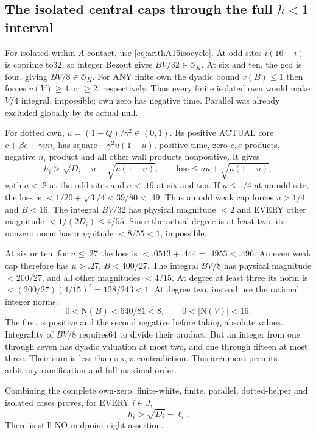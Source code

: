 \subsection{The isolated central caps through the full \(h<1\) interval}
\label{app:arithA15centralisolated}

For isolated-within-\(A\) contact, use
\eqref{eq:arithA15isocycle}.
At odd sites \(i(16-i)\) is coprime to32, so integer Bezout
gives \(BV/32\in\mathcal O_K\).
At six and ten, the gcd is four, giving \(BV/8\in\mathcal O_K\).
For ANY finite own the dyadic bound \(v(B)\le1\) then forces
\(v(V)\ge4\) or \(\ge2\), respectively.
Thus every finite isolated own would make \(V/4\) integral,
impossible; own zero has negative time.
Parallel was already excluded globally by its actual null.

For dotted own, \(u=(1-Q)/\gamma^2\in(0,1)\).
Its positive ACTUAL core
\(c+\beta e+\gamma u n_i\)
has square \(-\gamma^2u(1-u)\), positive time, zero \(c,e\)
products, negative \(n_i\) product and all other wall products
nonpositive.
It gives
\[
 h_i>\sqrt{D_i-u}-\sqrt{u(1-u)},\qquad
 \text{loss}\le au+\sqrt{u(1-u)} ,
\]
with \(a<.2\) at the odd sites and \(a<.19\) at six and ten.
If \(u\le1/4\) at an odd site, the loss is
\(<1/20+\sqrt3/4<39/80<.49\).
Thus an odd weak cap forces \(u>1/4\) and \(B<16\).
The integral \(BV/32\) has physical magnitude \(<2\) and
EVERY other magnitude \(<1/(2D_i)\le4/55\).
Since the actual degree is at least two, its nonzero norm has
magnitude \(<8/55<1\), impossible.

At six or ten, for \(u\le.27\) the loss is
\(<.0513+.444=.4953<.496\).
An even weak cap therefore has \(u>.27\), \(B<400/27\).
The integral \(BV/8\) has physical magnitude \(<200/27\),
and all other magnitudes \(<4/15\).
At degree at least three its norm is
\(<(200/27)(4/15)^2=128/243<1\).
At degree two, instead use the rational integer norms:
\[
       0<\mathrm N(B)<640/81<8,\qquad
       0<|\mathrm N(V)|<16 .
\]
The first is positive and the second negative before taking
absolute values.
Integrality of \(BV/8\) requires64 to divide their product.
But an integer from one through seven has dyadic valuation
at most two, and one through fifteen at most three.
Their sum is less than six, a contradiction.
This argument permits arbitrary ramification and full maximal order.

Combining the complete own-zero, finite-white, finite, parallel,
dotted-helper and isolated cases proves, for EVERY \(i\in J\),
\[
                            h_i>\sqrt{D_i}-\ell_i .
\]
There is still NO midpoint-eight assertion.

